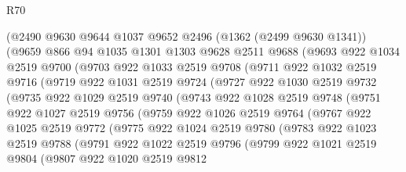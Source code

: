 \begin{lexlean}{R70}
\begin{coremodule}
      (@2490
        @9630
        @9644
        @1037
        @9652
        @2496
        (@1362 (@2499 @9630 @1341))
        (@9659
          @866
          @94
          @1035
          @1301
          @1303
          @9628
          @2511
          @9688
          (@9693
            @922
            @1034
            @2519
            @9700
            (@9703
              @922
              @1033
              @2519
              @9708
              (@9711
                @922
                @1032
                @2519
                @9716
                (@9719
                  @922
                  @1031
                  @2519
                  @9724
                  (@9727
                    @922
                    @1030
                    @2519
                    @9732
                    (@9735
                      @922
                      @1029
                      @2519
                      @9740
                      (@9743
                        @922
                        @1028
                        @2519
                        @9748
                        (@9751
                          @922
                          @1027
                          @2519
                          @9756
                          (@9759
                            @922
                            @1026
                            @2519
                            @9764
                            (@9767
                              @922
                              @1025
                              @2519
                              @9772
                              (@9775
                                @922
                                @1024
                                @2519
                                @9780
                                (@9783
                                  @922
                                  @1023
                                  @2519
                                  @9788
                                  (@9791
                                    @922
                                    @1022
                                    @2519
                                    @9796
                                    (@9799
                                      @922
                                      @1021
                                      @2519
                                      @9804
                                      (@9807
                                        @922
                                        @1020
                                        @2519
                                        @9812

\end{coremodule}
\end{lexlean}
